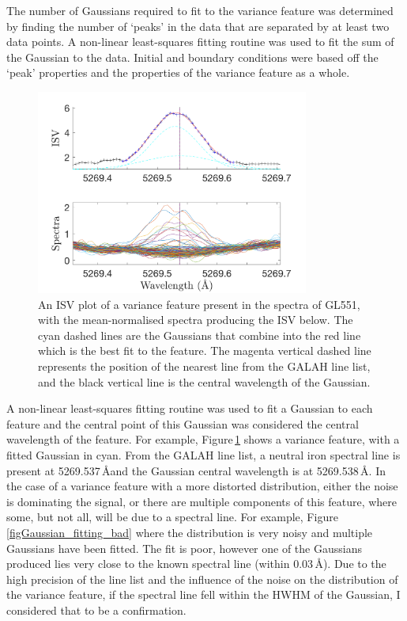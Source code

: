 The number of Gaussians required to fit to the variance feature was determined by finding the number of `peaks' in the data that are separated by at least two data points. A non-linear least-squares fitting routine was used to fit the sum of the Gaussian to the data. Initial and boundary conditions were based off the `peak' properties and the properties of the variance feature as a whole.\\

\begin{figure}
    \centering
    \captionsetup{width=.8\textwidth}
    \includegraphics[width=0.8\textwidth]{GL551_Gaussian_fit_good.png}
    \caption{An ISV plot of a variance feature present in the spectra of GL551, with the mean-normalised spectra producing the ISV below. The cyan dashed lines are the Gaussians that combine into the red line which is the best fit to the feature. The magenta vertical dashed line represents the position of the nearest line from the GALAH line list, and the black vertical line is the central wavelength of the Gaussian.}
    \label{figGaussian_fitting_good}
\end{figure}

A non-linear least-squares fitting routine was used to fit a Gaussian to each feature and the central point of this Gaussian was considered the central wavelength of the feature. For example, Figure\,\ref{figGaussian_fitting_good} shows a variance feature, with a fitted Gaussian in cyan. From the GALAH line list, a neutral iron spectral line is present at 5269.537\,\AA and the Gaussian central wavelength is at 5269.538\,\AA. In the case of a variance feature with a more distorted distribution, either the noise is dominating the signal, or there are multiple components of this feature, where some, but not all, will be due to a spectral line. For example, Figure\,\ref{figGaussian_fitting_bad} where the distribution is very noisy and multiple Gaussians have been fitted. The fit is poor, however one of the Gaussians produced lies very close to the known spectral line (within 0.03\,\AA). Due to the high precision of the line list and the influence of the noise on the distribution of the variance feature, if the spectral line fell within the HWHM of the Gaussian, I considered that to be a confirmation.\\

